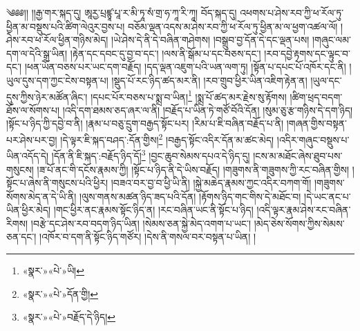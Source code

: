 ༄༅༅།། །།རྒྱ་གར་སྐད་དུ། ཨཱརྱ་པྲཛྙཱ་པཱ་ར་མི་ཏཱ་སཾ་གྲ་ཧ་ཀཱ་རི་ཀཱ། བོད་སྐད་དུ། འཕགས་པ་ཤེས་རབ་ཀྱི་ཕ་རོལ་ཏུ་ཕྱིན་མ་བསྡུས་པའི་ཚིག་ལེའུར་བྱས་པ། བཅོམ་ལྡན་འདས་མ་ཤེས་རབ་ཀྱི་ཕ་རོལ་ཏུ་ཕྱིན་མ་ལ་ཕྱག་འཚལ་ལོ། །ཤེས་རབ་ཕ་རོལ་ཕྱིན་གཉིས་མེད། །ཡེ་ཤེས་དེ་ནི་དེ་བཞིན་གཤེགས། །བསྒྲུབ་བྱ་དོན་དེ་དང་ལྡན་པས། །གཞུང་ལམ་དག་ལ་དེའི་སྒྲ་ཡིན། །རྟེན་དང་དབང་དུ་བྱ་བ་དང་། །ལས་ནི་སྒོམ་པ་དང་བཅས་དང་། །རབ་དབྱེ་རྟགས་དང་ལྟུང་བ་དང་། །ཕན་ཡོན་བཅས་པར་ཡང་དག་བརྗོད། །དད་ལྡན་འཇུག་པའི་ཡན་ལག་ཏུ། །སྟོན་པ་དཔང་པོ་འཁོར་དང་ནི། །ཡུལ་དུས་དག་ཀྱང་ངེས་བསྟན་པ། །སྡུད་པོ་རང་ཉིད་ཚད་མར་ནི། །རབ་གྲུབ་ཕྱིར་ཡིན་འཇིག་རྟེན་ན། །ཡུལ་དང་དུས་ཀྱིས་ཉེར་མཚོན་ཞིང་། །དཔང་པོར་བཅས་པ་སྨྲ་བ་ཡིན།\footnote{«སྣར་»«པེ་»ཡི།} །སྨྲ་པོ་ཚད་མར་རྗེས་སུ་རྟོགས། །ཚིག་ཕྲད་བདག་ཐོས་ལ་སོགས་པ། །འདི་དག་ཐམས་ཅད་ཞར་ལ་ནི། །བརྗོད་པ་ཡིན་ཏེ་གཙོ་བོའི་དོན། །སུམ་ཅུ་རྩ་གཉིས་དེ་དག་ཉིད། །སྟོང་པ་ཉིད་ཀྱི་དབྱེ་བ་ནི། །རྣམ་པ་བཅུ་དྲུག་བརྒྱད་སྟོང་པར། །རིམ་པ་ཇི་བཞིན་བརྗོད་པ་ནི། །གཞན་གྱིས་བསྟན་པར་ཤེས་པར་བྱ། །དེ་ལྟར་ཇི་སྐད་བཤད་:དོན་གྱིས།\footnote{«སྣར་»«པེ་»དོན་གྱི།} །བརྒྱད་སྟོང་འདིར་དོན་མ་ཚང་མེད། །འདིར་གཞུང་བསྡུས་པ་ཡིན་འདོད་དེ། །དོན་ནི་ཇི་སྐད་:བརྗོད་ཉིད་དོ།\footnote{«སྣར་»«པེ་»བརྗོད་དེ་ཉིད།} །བྱང་ཆུབ་སེམས་དཔའ་དེ་ཉིད་དུ། །ངས་མ་མཐོང་ཞེས་ཐུབ་པས་གསུངས། །ཟ་པོ་ནང་གི་དངོས་རྣམས་ཀྱི། །སྟོང་པ་ཉིད་ནི་དེ་ཡིས་བརྗོད། །གཟུགས་ནི་གཟུགས་ཀྱི་རང་བཞིན་གྱིས། །སྟོང་པ་ཞེས་ནི་གསུངས་པའི་ཕྱིར། །བཟའ་བར་བྱ་བ་ཕྱི་ཡི་ནི། །སྐྱེ་མཆེད་རྣམས་ཀྱང་འདིར་བཀག་གོ། །གཟུགས་སོགས་མེད་ན་དེ་ཡི་ནི། །ལུས་གནས་མཚན་ཉིད་ཟད་པའི་དོན། །རྟོགས་ཉིད་གང་གིས་དེ་མཐོང་བ། །དེ་ཡང་ནང་པ་ཡིན་ཕྱིར་མེད། །གང་ཕྱིར་ནང་རྣམས་སྟོང་ཉིད་ན། །རང་བཞིན་ཡང་ནི་སྟོང་པ་ཉིད། །འདི་ལྟར་རྣམ་ཤེས་རང་བཞིན་རིགས། །བརྩེ་དང་ཤེས་རབ་བདག་ཉིད་ཡིན། །སེམས་ཅན་སྐྱེ་མེད་འགག་པ་ཡང་། །མེད་ཅེས་སོགས་ཀྱིས་སེམས་ཅན་དང་། །འཁོར་བ་དག་ནི་སྟོང་ཉིད་གཙོར། །དེས་ནི་གསལ་བར་བསྟན་པ་ཡིན། །
